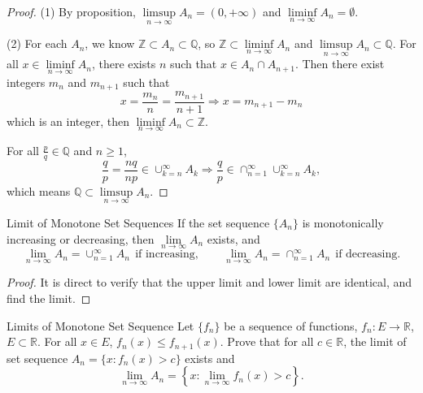 \begin{proof}
  (1) By proposition, $\limsup \limits_{n \rightarrow \infty} A_n = (0, +\infty)$ and
  $\liminf \limits_{n \rightarrow \infty} A_n = \emptyset$.

  (2) For each $A_n$, we know $\mathbb{Z} \subset A_n \subset \mathbb{Q}$, so
  $\mathbb{Z} \subset \liminf \limits_{n \rightarrow \infty} A_n$ and
  $\limsup \limits_{n \rightarrow \infty} A_n \subset \mathbb{Q}$.
  For all $x \in \liminf \limits_{n \rightarrow \infty} A_n$, there exists $n$
  such that $x \in A_n \cap A_{n+1}$.
  Then there exist integers $m_n$ and $m_{n+1}$ such that
  \begin{equation}
    x = \frac{m_n}{n} = \frac{m_{n+1}}{n+1} \Rightarrow x = m_{n+1} - m_n
  \end{equation}
  which is an integer, then $\liminf \limits_{n \rightarrow \infty} A_n \subset \mathbb{Z}$.

  For all $\frac{p}{q} \in \mathbb{Q}$ and $n \geq 1$,
  \begin{equation}
    \frac{q}{p} = \frac{nq}{np} \in \cup _{k = n}^{\infty} A_k
    \Rightarrow
    \frac{q}{p} \in \cap _{n = 1}^{\infty} \cup _{k = n}^{\infty}A_k,
  \end{equation}
  which means $\mathbb{Q} \subset \limsup \limits_{n \rightarrow \infty}A_n$.
\end{proof}

\begin{proposition}{Limit of Monotone Set Sequences}{}
  If the set sequence $\{A_n\}$ is monotonically increasing or decreasing,
  then $\lim \limits _{n \rightarrow \infty} A_n$ exists, and
  \begin{equation}
    \lim \limits _{n \rightarrow \infty} A_n = \cup _{n = 1}^{\infty} A_n ~~  \text{if increasing},
    \quad \quad
    \lim \limits _{n \rightarrow \infty} A_n = \cap _{n = 1}^{\infty} A_n ~~  \text{if decreasing}.
  \end{equation}
\end{proposition}

\begin{proof}
  It is direct to verify that the upper limit and lower limit are identical,
  and find the limit.
\end{proof}

\begin{example}{Limits of Monotone Set Sequence}{}
  Let $\{f_n\}$ be a sequence of functions, $f_n : E \rightarrow \mathbb{R}$, $E \subset \mathbb{R}$.
  For all $x \in E$, $f_n(x) \leq f_{n+1}(x)$. Prove that for all $c \in \mathbb{R}$,
  the limit of set sequence $A_n = \{x: f_n(x) > c\}$ exists and 
  \begin{equation}
    \lim \limits _{n \rightarrow \infty} A_n = \left\{ x:\lim \limits _{n \rightarrow \infty} f_n(x) > c \right\}.
  \end{equation}
\end{example}

